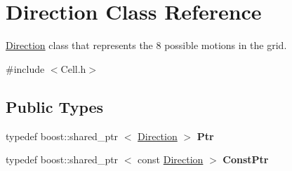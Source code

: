 \hypertarget{class_direction}{\section{\-Direction \-Class \-Reference}
\label{class_direction}
}


\hyperlink{class_direction}{\-Direction} class that represents the 8 possible motions in the grid.  




{\ttfamily \#include $<$\-Cell.\-h$>$}

\subsection*{\-Public \-Types}
\begin{DoxyCompactItemize}
\item 
\hypertarget{class_direction_ae3e9bc401f4a005ce80a2ec95ee36ba6}{typedef boost\-::shared\-\_\-ptr\*
$<$ \hyperlink{class_direction}{\-Direction} $>$ {\bfseries \-Ptr}}\label{class_direction_ae3e9bc401f4a005ce80a2ec95ee36ba6}

\item 
\hypertarget{class_direction_a4b418e2afcca0589936a4b94629a2dbd}{typedef boost\-::shared\-\_\-ptr\*
$<$ const \hyperlink{class_direction}{\-Direction} $>$ {\bfseries \-Const\-Ptr}}\label{class_direction_a4b418e2afcca0589936a4b94629a2dbd}

\end{DoxyCompactItemize}
